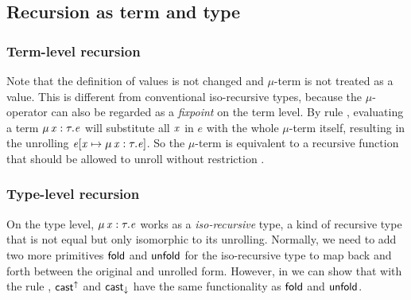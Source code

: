 \subsection{Recursion as term and type}
\subsubsection{Term-level recursion}
Note that the definition of values is not changed and $ \mu $-term is not treated as a value. This is different from conventional iso-recursive types, because the $ \mu $-operator can also be regarded as a \emph{fixpoint} on the term level. By rule , evaluating a term $\mu \, \mathit{x}  :  \tau  .  \mathit{e}$ will substitute all $\mathit{x}$ in $e$ with the whole $ \mu $-term itself, resulting in the unrolling $\mathit{e}  [  \mathit{x}  \mapsto  \mu \, \mathit{x}  :  \tau  .  \mathit{e}  ]$. So the $ \mu $-term is equivalent to a recursive function that should be allowed to unroll without restriction .

\subsubsection{Type-level recursion}
On the type level, $\mu \, \mathit{x}  :  \tau  .  \mathit{e}$ works as a \emph{iso-recursive} type, a kind of recursive type that is not equal but only isomorphic to its unrolling. Normally, we need to add two more primitives $\mathsf{fold}$ and $\mathsf{unfold}$ for the iso-recursive type to map back and forth between the original and unrolled form. However, in \name we can show that with the rule , $ \mathsf{cast}^{\uparrow} $ and $ \mathsf{cast}_{\downarrow} $ have the same functionality as $\mathsf{fold}$ and $\mathsf{unfold}$.

